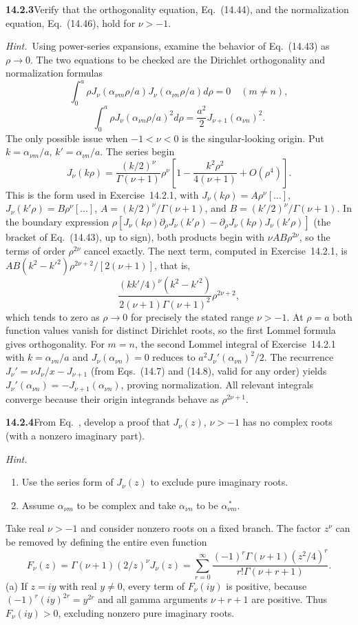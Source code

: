 \par\bigskip
\noindent\textbf{14.2.3}\quad Verify that the orthogonality equation,
Eq.~(14.44), and the normalization equation, Eq.~(14.46), hold for
$\nu>-1$.
\par\emph{Hint.}~Using power-series expansions, examine the behavior of
Eq.~(14.43) as $\rho\to0$.
\solution
The two equations to be checked are the Dirichlet orthogonality
and normalization formulas
\[
\int_0^a\rho J_\nu(\alpha_{\nu m}\rho/a)
J_\nu(\alpha_{\nu n}\rho/a)d\rho=0\quad(m\ne n),
\]
\[
\int_0^a\rho J_\nu(\alpha_{\nu n}\rho/a)^2d\rho
=\frac{a^2}{2}J_{\nu+1}(\alpha_{\nu n})^2.
\]
The only possible issue when $-1<\nu<0$ is the singular-looking
origin. Put $k=\alpha_{\nu m}/a$, $k'=\alpha_{\nu n}/a$.
The series begin
\[
J_\nu(k\rho)=\frac{(k/2)^\nu}{\Gamma(\nu+1)}\rho^\nu
\left[1-\frac{k^2\rho^2}{4(\nu+1)}+O(\rho^4)\right].
\]
This is the form used in Exercise~14.2.1, with
$J_\nu(k\rho)=A\rho^\nu[\ldots]$, $J_\nu(k'\rho)=B\rho^\nu[\ldots]$,
$A=(k/2)^\nu/\Gamma(\nu+1)$, and $B=(k'/2)^\nu/\Gamma(\nu+1)$.
In the boundary expression
$\rho[J_\nu(k\rho)\partial_\rho J_\nu(k'\rho)
-\partial_\rho J_\nu(k\rho)J_\nu(k'\rho)]$ (the bracket of
Eq.~(14.43), up to sign), both products begin with $\nu AB\rho^{2\nu}$, so the terms of order
$\rho^{2\nu}$ cancel exactly. The next term, computed in
Exercise~14.2.1, is $AB(k^2-k'^2)\rho^{2\nu+2}/[2(\nu+1)]$, that is,
\[
\frac{(kk'/4)^\nu(k^2-k'^2)}
{2(\nu+1)\Gamma(\nu+1)^2}\rho^{2\nu+2},
\]
which tends to zero as $\rho\to0$ for precisely the stated range $\nu>-1$.
At $\rho=a$ both function values vanish for distinct Dirichlet
roots, so the first Lommel formula gives orthogonality. For $m=n$,
the second Lommel integral of Exercise~14.2.1 with
$k=\alpha_{\nu n}/a$ and $J_\nu(\alpha_{\nu n})=0$ reduces to
$a^2J_\nu'(\alpha_{\nu n})^2/2$. The recurrence
$J_\nu'=\nu J_\nu/x-J_{\nu+1}$ (from Eqs.~(14.7) and (14.8), valid
for any order) yields
$J_\nu'(\alpha_{\nu n})=-J_{\nu+1}(\alpha_{\nu n})$, proving
normalization. All relevant integrals converge because their
origin integrands behave as $\rho^{2\nu+1}$.

\par\bigskip
\noindent\textbf{14.2.4}\quad From Eq.~, develop a
proof that $J_{\nu}(z)$, $\nu>-1$ has no complex roots (with a nonzero
imaginary part).
\par\emph{Hint.}
\begin{enumerate}
\item[(a)] Use the series form of $J_{\nu}(z)$ to exclude pure
imaginary roots.
\item[(b)] Assume $\alpha_{\nu m}$ to be complex and take
$\alpha_{\nu n}$ to be $\alpha_{\nu m}^{\,*}$.
\end{enumerate}
\solution
Take real $\nu>-1$ and consider nonzero roots on a fixed
branch. The factor $z^\nu$ can be removed by defining the entire
even function
\[
F_\nu(z)=\Gamma(\nu+1)(2/z)^\nu J_\nu(z)
=\sum_{r=0}^\infty
\frac{(-1)^r\Gamma(\nu+1)(z^2/4)^r}
{r!\Gamma(\nu+r+1)}.
\]
(a) If $z=iy$ with real $y\ne0$, every term of $F_\nu(iy)$
is positive, because $(-1)^r(iy)^{2r}=y^{2r}$ and all gamma
arguments $\nu+r+1$ are positive. Thus $F_\nu(iy)>0$, excluding
nonzero pure imaginary roots.

